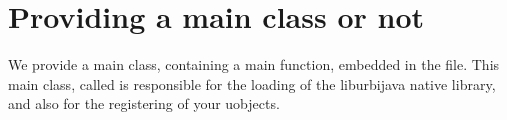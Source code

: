 %
%
%
%
%
%
%
%
%
%
%


\section{Providing a main class or not}

We provide a main class, containing a main function, embedded in the
 file. This main class, called 
is responsible for the loading of the liburbijava native library, and also
for the registering of your uobjects.

